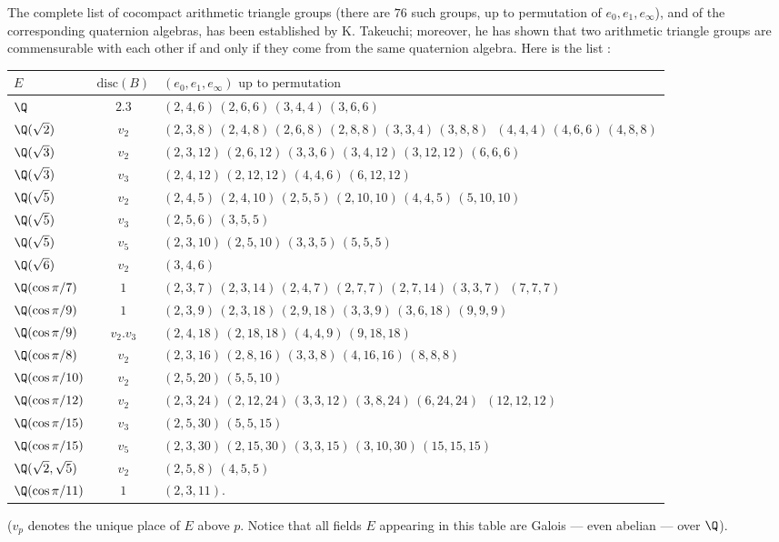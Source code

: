 \begin{para}\label{para::5.4.2} The complete list of cocompact
 arithmetic triangle groups (there are $76$ such groups, up to
 permutation of $e_0,e_1,e_\infty$), and of the corresponding quaternion
 algebras, has been established by K. Takeuchi; moreover, he has shown
 that two arithmetic triangle groups are commensurable with each other
 if and only if they come from the same quaternion algebra. Here is the
 list \cite[Table 1]{ccoatg}:

\renewcommand{\arraystretch}{1.5}
\begin{longtable}{lcp{}}
 $E$ & $\mathrm{disc}(B)$ & $ (e_0,e_1,e_\infty)\text{ up to permutation}$ \\
 \hline
 $\Q$ & $2.3$ & $(2,4,6)\, (2,6,6)\, (3,4,4)\, (3,6,6)$ \\
 $\Q(\sqrt 2)$ & $v_2$ &
 $(2,3,8)\, (2,4,8)\, (2,6,8)\, (2,8,8)\, (3,3,4)\, (3,8,8)\,$ 
 $(4,4,4)\, (4,6,6)\, (4,8,8)$ \\
 $\Q(\sqrt 3)$ & $v_2$ &
 $(2,3,12)\, (2,6,12)\, (3,3,6)\, (3,4,12)\, (3,12,12)\, (6,6,6)\,$ \\
 $\Q(\sqrt 3)$ & $v_3$ & $(2,4,12)\, (2,12,12)\, (4,4,6)\, (6,12,12)\,$ \\
 $\Q(\sqrt 5)$ & $v_2$ & $(2,4,5)\, (2,4,10)\, (2,5,5)\, (2,10,10)\,
 (4,4,5)\, (5,10,10)$ \\
 $\Q(\sqrt 5)$ & $v_3$ & $(2,5,6)\, (3,5,5)$ \\
 $\Q(\sqrt 5)$ & $v_5$ & $(2,3,10)\, (2,5,10)\, (3,3,5)\, (5,5,5)$ \\
 $\Q(\sqrt 6)$ & $v_2$ & $(3,4,6)$ \\
 $\Q(\cos \pi/7)$ & $1$ &
 $(2,3,7)\, (2,3,14)\, (2,4,7)\, (2,7,7)\, (2,7,14)\, (3,3,7)\,$ 
 $(7,7,7)$ \\ 
 $\Q(\cos \pi/9)$ & $1$ & $(2,3,9)\, (2,3,18)\, (2,9,18)\, (3,3,9)\,
 (3,6,18)\, (9,9,9)$ \\
 $\Q(\cos \pi/9)$ & $v_2.v_3$ &
 $(2,4,18)\, (2,18,18)\, (4,4,9)\, (9,18,18)$ \\
 $\Q(\cos \pi/8)$ & $v_2$ &
 $(2,3,16)\, (2,8,16)\, (3,3,8)\, (4,16,16)\, (8,8,8)$ \\
 $\Q(\cos \pi/10)$ & $v_2$ & $(2,5,20)\, (5,5,10)$ \\
 $\Q(\cos \pi/12)$ & $v_2$ & 
 $(2,3,24)\, (2,12,24)\, (3,3,12)\, (3,8,24)\, (6,24,24)\,$ $(12,12,12)$ \\
 $\Q(\cos \pi/15)$ & $v_3$ & $(2,5,30)\, (5,5,15)$ \\
 $\Q(\cos \pi/15)$ & $v_5$ &
 $(2,3,30)\, (2,15,30)\, (3,3,15)\, (3,10,30)\, (15,15,15)$ \\
 $\Q(\sqrt 2, \sqrt 5)$ & $v_2$ & $(2,5,8)\, (4,5,5)$ \\
 $\Q(\cos \pi/11)$ & $1$ & $(2,3,11).$\\
\end{longtable}

\medskip\noindent ($v_p$ denotes the unique place of $E$ above
 $p$. Notice that all fields 
 $E$ appearing in this table are Galois --- even abelian --- over $\Q$).
\end{para}

